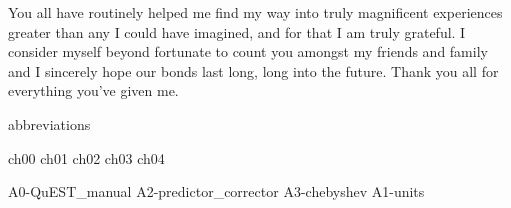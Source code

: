 \documentclass[mixedtoc]{msu-thesis-custom}
\begin{document}
You all have routinely helped me find my way into truly magnificent experiences
greater than any I could have imagined, and for that I am truly grateful. I
consider myself beyond fortunate to count you amongst my friends and family and
I sincerely hope our bonds last long, long into the future. Thank you all for
everything you've given me.

\begin{center}
  \smiley{}
\end{center}



\clearpage
\SingleSpacing
\tableofcontents* %
\clearpage
\listoftables %
\clearpage
\listoffigures %

%
\makenomenclature
{abbreviations}

\mainmatter
%

{ch00}
{ch01}
{ch02}
{ch03}
{ch04}

%
%

\begin{appendices}
  {A0-QuEST_manual}
  {A2-predictor_corrector}
  {A3-chebyshev}
  {A1-units}
\end{appendices}

\backmatter
%
%
\makebibliographypage %
%
\SingleSpacing
\end{document}
